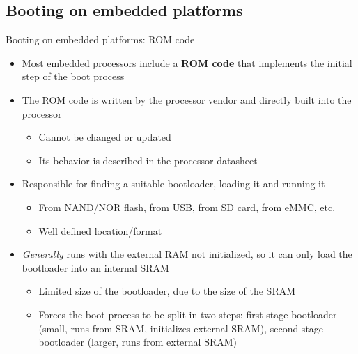 \subsection{Booting on embedded platforms}

\begin{frame}{Booting on embedded platforms: ROM code}
  \begin{itemize}
  \item Most embedded processors include a {\bf ROM code} that
    implements the initial step of the boot process
  \item The ROM code is written by the processor vendor and directly
    built into the processor
    \begin{itemize}
    \item Cannot be changed or updated
    \item Its behavior is described in the processor datasheet
    \end{itemize}
  \item Responsible for finding a suitable bootloader, loading it and
    running it
    \begin{itemize}
    \item From NAND/NOR flash, from USB, from SD card, from eMMC, etc.
    \item Well defined location/format
    \end{itemize}
  \item {\em Generally} runs with the external RAM not initialized, so
    it can only load the bootloader into an internal SRAM
    \begin{itemize}
    \item Limited size of the bootloader, due to the size of the SRAM
    \item Forces the boot process to be split in two steps: first
      stage bootloader (small, runs from SRAM, initializes external SRAM),
      second stage bootloader (larger, runs from external SRAM)
    \end{itemize}
  \end{itemize}
\end{frame}

